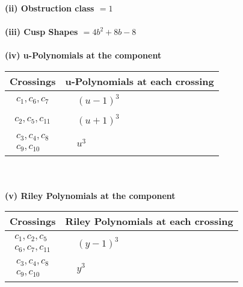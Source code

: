 \documentclass[1p]{elsarticle_modified}
\theoremstyle{definition}
\begin{document}
\flushleft \textbf{(ii) Obstruction class $= 1$}\\~\\
\flushleft \textbf{(iii) Cusp Shapes $= 4 b^2+8 b-8$}\\~\\
\newpage\renewcommand{\arraystretch}{1}
\flushleft \textbf{(iv) u-Polynomials at the component}\newline \\
\begin{tabular}{m{50pt}|m{274pt}}
Crossings & \hspace{64pt}u-Polynomials at each crossing \\
\hline $$\begin{aligned}c_{1},c_{6},c_{7}\end{aligned}$$&$\begin{aligned}
&(u-1)^3
\end{aligned}$\\
\hline $$\begin{aligned}c_{2},c_{5},c_{11}\end{aligned}$$&$\begin{aligned}
&(u+1)^3
\end{aligned}$\\
\hline $$\begin{aligned}c_{3},c_{4},c_{8}\\c_{9},c_{10}\end{aligned}$$&$\begin{aligned}
&u^3
\end{aligned}$\\
\hline
\end{tabular}\\~\\
\newpage\renewcommand{\arraystretch}{1}
\flushleft \textbf{(v) Riley Polynomials at the component}\newline \\
\begin{tabular}{m{50pt}|m{274pt}}
Crossings & \hspace{64pt}Riley Polynomials at each crossing \\
\hline $$\begin{aligned}c_{1},c_{2},c_{5}\\c_{6},c_{7},c_{11}\end{aligned}$$&$\begin{aligned}
&(y-1)^3
\end{aligned}$\\
\hline $$\begin{aligned}c_{3},c_{4},c_{8}\\c_{9},c_{10}\end{aligned}$$&$\begin{aligned}
&y^3
\end{aligned}$\\
\hline
\end{tabular}\\~\\
\end{document}
